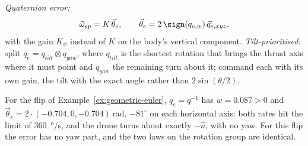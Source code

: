 \begin{result}
\emph{Quaternion error:}
\begin{equation}\label{eq:geometric-quat}
  \vec\omega_{sp} = K\,\vec\theta_e, \qquad \vec\theta_e = 2\,\sign(q_{e,w})\,\vec q_{e,xyz},
\end{equation}
with the gain $K_\psi$ instead of $K$ on the body's vertical component. \emph{Tilt-prioritised:} split $q_e = q_{tilt} \otimes q_{yaw}$, where $q_{tilt}$ is the shortest rotation that brings the thrust axis where it must point and $q_{yaw}$ the remaining turn about it; command each with its own gain, the tilt with the exact angle rather than $2\sin(\theta/2)$.
\end{result}

For the flip of Example~\ref{ex:geometric-euler}, $q_e = q^{-1}$ has $w = 0.087 > 0$ and $\vec\theta_e = 2 \cdot (-0.704, 0, -0.704)$\,rad, $-81^\circ$ on each horizontal axis: both rates hit the limit of \SI{360}{\degree/s}, and the drone turns about exactly $-\hat n$, with no yaw. For this flip the error has no yaw part, and the two laws on the rotation group are identical.


